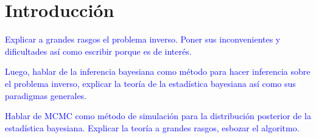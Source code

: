 \chapter{Introducción}

\textcolor{blue}{Explicar a grandes rasgos el problema inverso. Poner sus inconvenientes y dificultades así como escribir porque es de interés. }

\vspace{2 cm}

\textcolor{blue}{
Luego, hablar de la inferencia bayesiana como método para hacer inferencia sobre el problema inverso, explicar la teoría de la estadística bayesiana así como sus paradigmas generales.}

\vspace{2 cm}

\textcolor{blue}{
Hablar de MCMC como método de simulación para la distribución posterior de la estadística bayesiana. Explicar la teoría a grandes rasgos, esbozar el algoritmo.}






